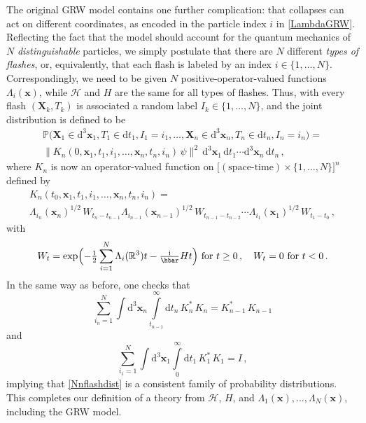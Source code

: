 \documentclass[12pt]{article}
\newcommand{\RRR}{\mathbb{R}}
\newcommand{\PPP}{\mathbb{P}}
\newcommand{\Hilbert}{\mathscr{H}}
\newcommand{\vx}{\boldsymbol{x}}
\newcommand{\vX}{{\boldsymbol{X}}}
\newcommand{\D}{\mathrm{d}} %
\newcommand{\I}{\mathrm{i}} %
\newcommand{\1}{1}
\newcommand{\K}{K}
\begin{document}
The original GRW model contains one further complication: that collapses can act on different coordinates, as encoded in the particle index $i$ in \eqref{LambdaGRW}. Reflecting the fact that the model should account for the quantum mechanics of $N$ \emph{distinguishable} particles, we simply postulate that there are $N$ different \emph{types of flashes}, or, equivalently, that each flash is labeled by an index $i \in \{1,\ldots,N\}$. Correspondingly, we need to be given $N$ positive-operator-valued functions $\Lambda_i(\vx)$, while $\Hilbert$ and $H$ are the same for all types of flashes. Thus, with every flash $(\vX_k,T_k)$ is associated a random label $I_k \in \{1, \ldots, N\}$, and the joint distribution is defined to be
\begin{multline}\label{Nnflashdist}
  \PPP\bigl( \vX_1\in \D^3 \vx_1, T_1 \in \D t_1, I_1 = i_1, \ldots,
  \vX_n \in \D^3 \vx_n, T_n \in \D t_n, I_n = i_n \bigr) =\\ 
  \bigl\| \K_n(0,\vx_1, t_1,i_1, \ldots, \vx_n, t_n,i_n) \, \psi \bigr\|^2 
  \, \D^3 \vx_1 \, \D t_1 \cdots \D^3 \vx_n \, \D t_n \,,
\end{multline}
where $\K_n$ is now an operator-valued function on $\bigl[(\text{space-time}) \times \{1,\ldots,N\}\bigr]^n$ defined by
\begin{multline}\label{Knidef}
  \K_n(t_0,\vx_1, t_1,i_1, \ldots, \vx_n, t_n, i_n) =\\
  \Lambda_{i_n}(\vx_n)^{1/2} \,W_{t_n-t_{n-1}} \Lambda_{i_{n-1}}(\vx_{n-1})^{1/2} 
  \,W_{t_{n-1}-t_{n-2}}
  \cdots \Lambda_{i_1}(\vx_1)^{1/2} \, W_{t_1-t_0} \,,
\end{multline}
with
\begin{equation}\label{WNdef}
  W_t = \exp\Bigl(-\tfrac{1}{2} \sum_{i=1}^N \Lambda_i (\RRR^3)t 
  - \tfrac{\I}{\hbar} Ht\Bigr) 
  \text{ for }t\geq 0\,, \quad W_t = 0 \text{ for } t<0 \,.
\end{equation}
In the same way as before, one checks that
\begin{equation}
  \sum_{i_n=1}^N \int \D^3 \vx_n \int\limits_{t_{n-1}}^\infty \D t_n \, \K^*_n \,\K_n = 
  \K^*_{n-1} \, \K_{n-1}
\end{equation}
and
\begin{equation}
  \sum_{i_1=1}^N \int \D^3 \vx_1 \int\limits_{0}^\infty \D t_1 \, \K^*_1 \,\K_1 = I \,,
\end{equation}
implying that \eqref{Nnflashdist} is a consistent family of probability distributions. This completes our definition of a theory from $\Hilbert$, $H$, and $\Lambda_1(\vx), \ldots, \Lambda_N(\vx)$, including the GRW model. 
\end{document}
